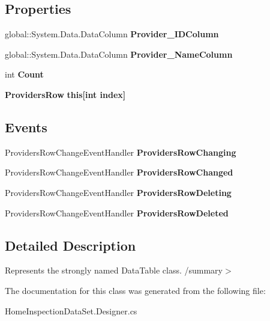 \subsection*{Properties}
\begin{DoxyCompactItemize}
\item 
\mbox{\label{class_a_f_h___scheduler_1_1_home_inspection_data_set_1_1_providers_data_table_a6e48dee67bad47898eecb81851bc1b8a}} 
global\+::\+System.\+Data.\+Data\+Column {\bfseries Provider\+\_\+\+I\+D\+Column}\hspace{0.3cm}{\ttfamily  [get]}
\item 
\mbox{\label{class_a_f_h___scheduler_1_1_home_inspection_data_set_1_1_providers_data_table_a053237127b5393b91b6d6f594cab1d8c}} 
global\+::\+System.\+Data.\+Data\+Column {\bfseries Provider\+\_\+\+Name\+Column}\hspace{0.3cm}{\ttfamily  [get]}
\item 
\mbox{\label{class_a_f_h___scheduler_1_1_home_inspection_data_set_1_1_providers_data_table_ab36409a17be20a49127ee142bbbd97b0}} 
int {\bfseries Count}\hspace{0.3cm}{\ttfamily  [get]}
\item 
\mbox{\label{class_a_f_h___scheduler_1_1_home_inspection_data_set_1_1_providers_data_table_aaa0565efda7bca849e3d1631367bb67d}} 
\textbf{ Providers\+Row} {\bfseries this[int index]}\hspace{0.3cm}{\ttfamily  [get]}
\end{DoxyCompactItemize}
\subsection*{Events}
\begin{DoxyCompactItemize}
\item 
\mbox{\label{class_a_f_h___scheduler_1_1_home_inspection_data_set_1_1_providers_data_table_a7aee5be19ee44e3d6814bee1c076177e}} 
Providers\+Row\+Change\+Event\+Handler {\bfseries Providers\+Row\+Changing}
\item 
\mbox{\label{class_a_f_h___scheduler_1_1_home_inspection_data_set_1_1_providers_data_table_a8dd718544222c84aeda446127c65e0e8}} 
Providers\+Row\+Change\+Event\+Handler {\bfseries Providers\+Row\+Changed}
\item 
\mbox{\label{class_a_f_h___scheduler_1_1_home_inspection_data_set_1_1_providers_data_table_a3d8ebe4a49262c850d63734cefe16fb5}} 
Providers\+Row\+Change\+Event\+Handler {\bfseries Providers\+Row\+Deleting}
\item 
\mbox{\label{class_a_f_h___scheduler_1_1_home_inspection_data_set_1_1_providers_data_table_a46f388bdc2f81ac5025dacc353b999d5}} 
Providers\+Row\+Change\+Event\+Handler {\bfseries Providers\+Row\+Deleted}
\end{DoxyCompactItemize}


\subsection{Detailed Description}
Represents the strongly named Data\+Table class. /summary$>$ 

The documentation for this class was generated from the following file\+:\begin{DoxyCompactItemize}
\item 
Home\+Inspection\+Data\+Set.\+Designer.\+cs\end{DoxyCompactItemize}

